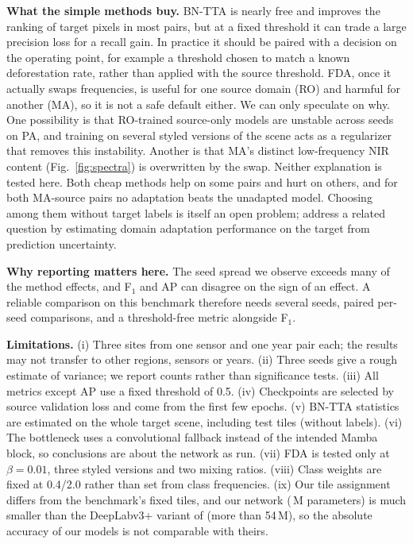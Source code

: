 \documentclass[pdflatex,sn-basic]{sn-jnl}
\newcommand{\BNTTA}{BN-TTA}
\newcommand{\Fone}{F$_1$}
\begin{document}
\textbf{What the simple methods buy.}
\BNTTA{} is nearly free and improves the ranking of target pixels in most pairs, but at a fixed threshold it can trade a large precision loss for a recall gain.
In practice it should be paired with a decision on the operating point, for example a threshold chosen to match a known deforestation rate, rather than applied with the source threshold.
FDA, once it actually swaps frequencies, is useful for one source domain (RO) and harmful for another (MA), so it is not a safe default either.
We can only speculate on why.
One possibility is that RO-trained source-only models are unstable across seeds on PA, and training on several styled versions of the scene acts as a regularizer that removes this instability.
Another is that MA's distinct low-frequency NIR content (Fig.~\ref{fig:spectra}) is overwritten by the swap.
Neither explanation is tested here.
Both cheap methods help on some pairs and hurt on others, and for both MA-source pairs no adaptation beats the unadapted model.
Choosing among them without target labels is itself an open problem; \citet{ortega2026domain} address a related question by estimating domain adaptation performance on the target from prediction uncertainty.

\textbf{Why reporting matters here.}
The seed spread we observe exceeds many of the method effects, and \Fone{} and AP can disagree on the sign of an effect.
A reliable comparison on this benchmark therefore needs several seeds, paired per-seed comparisons, and a threshold-free metric alongside \Fone{}.

\textbf{Limitations.}
(i) Three sites from one sensor and one year pair each; the results may not transfer to other regions, sensors or years.
(ii) Three seeds give a rough estimate of variance; we report counts rather than significance tests.
(iii) All metrics except AP use a fixed threshold of 0.5.
(iv) Checkpoints are selected by source validation loss and come from the first few epochs.
(v) \BNTTA{} statistics are estimated on the whole target scene, including test tiles (without labels).
(vi) The bottleneck uses a convolutional fallback instead of the intended Mamba block, so conclusions are about the network as run.
(vii) FDA is tested only at $\beta=0.01$, three styled versions and two mixing ratios.
(viii) Class weights are fixed at 0.4/2.0 rather than set from class frequencies.
(ix) Our tile assignment differs from the benchmark's fixed tiles, and our network (\ParamsM{}\,M parameters) is much smaller than the DeepLabv3+ variant of \citet{demoura2025enhancing} (more than 54\,M), so the absolute accuracy of our models is not comparable with theirs.
\end{document}
